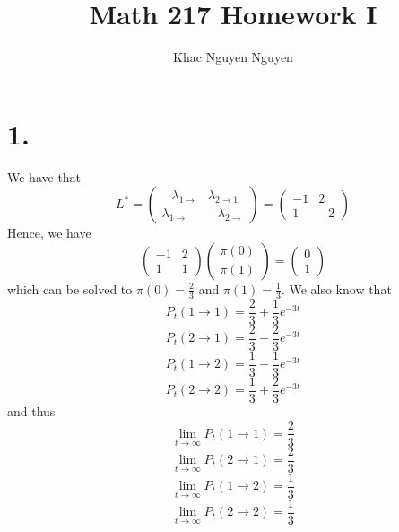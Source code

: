\documentclass[11pt]{article}
\title{\textbf{Math 217 Homework I}}
\author{Khac Nguyen Nguyen}
\date{}
\begin{document}
\section*{1.}
We have that 
\[
    L^* = 
    \begin{pmatrix}
        -\lambda_{1 \to} & \lambda_{2 \to 1} \\
        \lambda_{1 \to} & -\lambda_{2 \to}
    \end{pmatrix}
    = 
    \begin{pmatrix}
        -1 & 2 \\
        1 & -2
    \end{pmatrix}
\]
Hence, we have 
\[
    \begin{pmatrix}
        -1 & 2 \\
        1 & 1
    \end{pmatrix}
    \begin{pmatrix}
        \pi(0) \\
        \pi(1)
    \end{pmatrix}
    = 
    \begin{pmatrix}
        0 \\
        1 
    \end{pmatrix}
\]
which can be solved to $\pi(0) = \frac{2}{3}$ and $\pi(1) = \frac{1}{3}$. We also know that 
\[
    P_t(1 \to 1) = \frac{2}{3} + \frac{1}{3}e^{-3t}
\]
\[
    P_t(2 \to 1) = \frac{2}{3} - \frac{2}{3}e^{-3t}
\]
\[
    P_t(1 \to 2) = \frac{1}{3} - \frac{1}{3}e^{-3t}
\]
\[
    P_t(2 \to 2) = \frac{1}{3} + \frac{2}{3}e^{-3t}
\]
and thus 
\[
    \lim_{t \to \infty} P_t(1 \to 1) = \frac{2}{3} 
\]
\[
    \lim_{t \to \infty} P_t(2 \to 1) = \frac{2}{3} 
\]
\[
    \lim_{t \to \infty} P_t(1 \to 2) = \frac{1}{3}
\]
\[
    \lim_{t \to \infty} P_t(2 \to 2) = \frac{1}{3}
\]
\newpage
\end{document}
